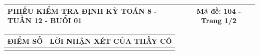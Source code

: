 \documentclass[12pt,a4paper]{article}
\begin{document}
\newpage
\noindent
\begin{tabularx}{\linewidth}{|X|c|}
\hline
\textbf{PHIẾU KIỂM TRA ĐỊNH KỲ TOÁN 8 - TUẦN 12 - BUỔI 01} & \textbf{Mã đề: 104 - Trang 1/2} \\
\hline
\end{tabularx}

\vspace{1.0mm}

\noindent
\begin{tabularx}{\linewidth}{|p{3.2cm}|X|}
\hline
\centering\textbf{ĐIỂM SỐ} & \centering\textbf{LỜI NHẬN XÉT CỦA THẦY CÔ} \tabularnewline
\hline
\rule{0pt}{1.8cm} & \tabularnewline
\hline
\end{tabularx}
\end{document}
